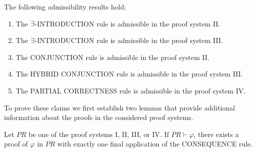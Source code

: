 \documentclass[runningheads]{llncs}       %
\begin{document}
\begin{lemma}[Admissibility] \label{lem:admissibility}
The following admissibility results hold:


 \begin{enumerate} [$(i)$] 
    
   \item The $\mbox{$\exists$}$-{\rm INTRODUCTION} rule is admissible in the proof system {\rm II}. 
   
    \vspace{2mm}
        
   \item The $\mbox{$\exists$}$-{\rm INTRODUCTION} rule is admissible in the proof system {\rm III}.
   
    \vspace{2mm}
  
   \item The {\rm CONJUNCTION} rule is admissible in the proof system {\rm II}.
   
    \vspace{2mm}

   \item The {\rm HYBRID CONJUNCTION} rule is admissible in the proof system {\rm III}.
         
    \vspace{2mm}
         
   \item The {\rm PARTIAL CORRECTNESS} rule is admissible in the proof system {\rm IV}.
   
   

 \end{enumerate}

\end{lemma}

To prove these claims we first establish two lemmas that provide additional
information about the proofs in the considered proof systems.

\begin{lemma} \label{lemma:1}
Let $\mathit{PR}$ be one of the proof systems I, II, III, or IV.
If $\mathit{PR} \vdash \varphi$, there exists a proof of $\varphi$ in $\mathit{PR}$ 
with exactly one final application of the CONSEQUENCE rule.
\end{lemma}
\end{document}
